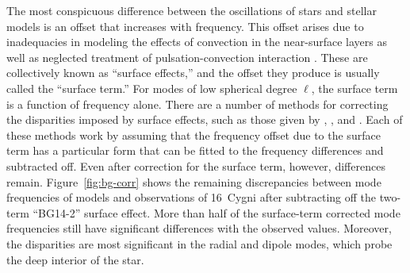 The most conspicuous difference between the oscillations of stars and stellar models is an offset that increases with frequency. This offset arises due to inadequacies in modeling the effects of convection in the near-surface layers \citep[see, e.g.,][]{1984srps.conf...11C} as well as neglected treatment of pulsation-convection interaction \citep{2017MNRAS.464L.124H}. 
These are collectively known as ``surface effects,'' and the offset they produce is usually called the ``surface term.'' 
For modes of low spherical degree $\ell$, the surface term is a function of frequency alone. 
There are a number of methods for correcting the disparities imposed by surface effects, such as those given by \citet{2008ApJ...683L.175K}, \citet[][hereinafter BG14]{2014A&A...568A.123B}, and \citet{2015A&A...583A.112S}. 
Each of these methods work by assuming that the frequency offset due to the surface term has a particular form that can be fitted to the frequency differences and subtracted off. 
Even after correction for the surface term, however, differences remain. 
Figure~\ref{fig:bg-corr} shows the remaining discrepancies between mode frequencies of models and observations of 16~Cygni after subtracting off the two-term ``BG14-2'' surface effect. 
More than half of the surface-term corrected mode frequencies still have significant differences with the observed values. 
Moreover, the disparities are most significant in the radial and dipole modes, which probe the deep interior of the star. 


